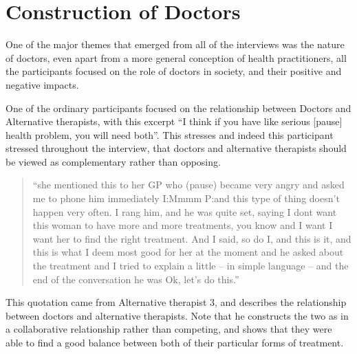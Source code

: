 

\section{Construction of Doctors}
\label{sec:construction-doctors}

One of the major themes that emerged from all of the interviews was the nature of doctors, even apart from a more general conception of health practitioners, all the participants focused on the role of doctors in society, and their positive and negative impacts. 

One of the ordinary participants focused on the relationship between Doctors and Alternative therapists, with this excerpt ``I think if you have like serious [pause] health problem, you will need both''. This stresses and indeed this participant stressed throughout the interview, that doctors and alternative therapists should be viewed as complementary rather than opposing. 

\begin{quotation}
  ``she mentioned this to her GP who (pause) became very angry and asked me to phone him immediately 
I:Mmmm
P:and this type of thing doesn't happen very often. I rang him, and he was quite set, saying I dont want this woman to have more and more treatments, you know and I want I want her to find the right treatment. And I said, so do I, and this is it, and this is what I deem most good for her at the moment and he asked about the treatment and I tried to explain a little – in simple language – and the end of the conversation he was Ok, let's do this.'' 

\end{quotation}

This quotation came from Alternative therapist 3, and describes the relationship between doctors and alternative therapists. Note that he constructs the two as in a collaborative relationship rather than competing, and shows that they were able to find a good balance between both of their particular forms of treatment. 

